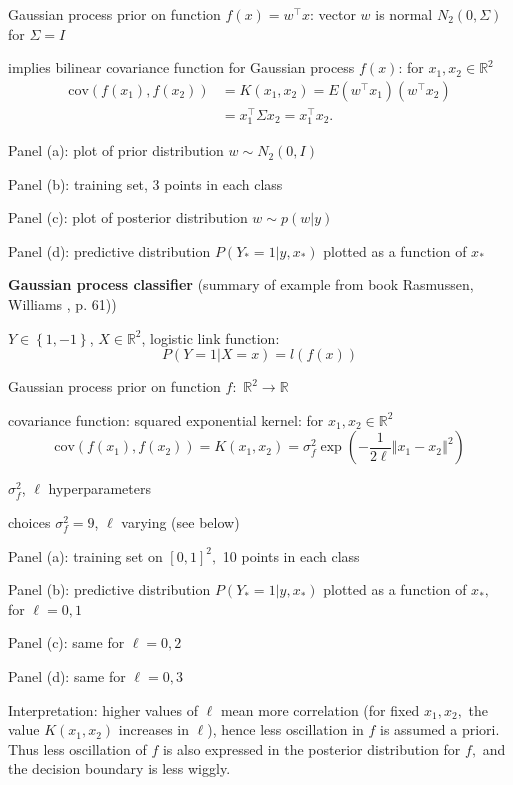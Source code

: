 \documentclass[11pt,twoside]{article}%
\theoremstyle{change}
\begin{document}
Gaussian process prior on function $f(x)=w^{\top}x$: vector $w$ is normal
$N_{2}\left(  0,\Sigma\right)  $ for $\Sigma=I$

implies bilinear covariance function for Gaussian process $f(x)$: for
$x_{1},x_{2}\in\mathbb{R}^{2}$
\begin{align*}
\mathrm{cov}\left(  f(x_{1}),f(x_{2})\right)   & =K(x_{1},x_{2})=E\left(
w^{\top}x_{1}\right)  \left(  w^{\top}x_{2}\right) \\
& =x_{1}^{\top}\Sigma x_{2}=x_{1}^{\top}x_{2}.
\end{align*}


Panel (a): plot of prior distribution $w\sim N_{2}\left(  0,I\right)  $

Panel (b): training set, 3 points in each class

Panel (c): plot of posterior distribution $w\sim p(w|y)$

Panel (d): predictive distribution $P\left(  Y_{\ast}=1|y,x_{\ast}\right)  $
plotted as a function of $x_{\ast}$

\bigskip

\textbf{Gaussian process classifier} (summary of example from book Rasmussen,
Williams \cite{RW}, p. 61))

$Y\in\left\{  1,-1\right\}  $, $X\in\mathbb{R}^{2}$, logistic link function:
\[
P\left(  Y=1|X=x\right)  =l\left(  f(x)\right)
\]


Gaussian process prior on function $f:$ $\mathbb{R}^{2}\rightarrow\mathbb{R} $

covariance function: squared exponential kernel: for $x_{1},x_{2}\in
\mathbb{R}^{2}$
\[
\mathrm{cov}\left(  f(x_{1}),f(x_{2})\right)  =K(x_{1},x_{2})=\sigma_{f}%
^{2}\exp\left(  -\frac{1}{2\ell}\left\Vert x_{1}-x_{2}\right\Vert ^{2}\right)
\]


$\sigma_{f}^{2}$, $\ell$ hyperparameters

choices $\sigma_{f}^{2}=9$, $\ell$ varying (see below)

Panel (a): training set on $[0,1]^{2},$ 10 points in each class

Panel (b): predictive distribution $P\left(  Y_{\ast}=1|y,x_{\ast}\right)  $
plotted as a function of $x_{\ast},$ for $\ell=0,1$

Panel (c): same for $\ell=0,2$

Panel (d): same for $\ell=0,3$

Interpretation: higher values of $\ell$ mean more correlation (for fixed
$x_{1},x_{2},$ the value $K(x_{1},x_{2})$ increases in $\ell$), hence less
oscillation in $f$ is assumed a priori. Thus less oscillation of $f$ is also
expressed in the posterior distribution for $f,$ and the decision boundary is
less wiggly.
\end{document}
